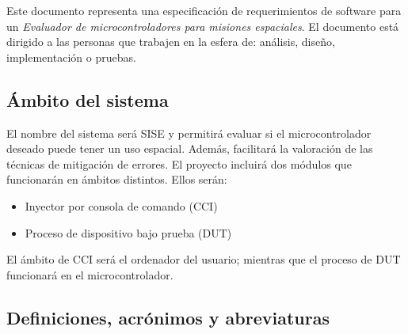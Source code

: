 \documentclass[
11pt, %
codirector, %
]{charter}
\begin{document}
Este documento representa una especificación de requerimientos de software para un \emph{Evaluador de microcontroladores para misiones espaciales}.
El documento está dirigido a las personas que trabajen en la esfera de: análisis, diseño, implementación o pruebas.

\subsection{Ámbito del sistema}
\label{sub:ambito}

El nombre del sistema será SISE y permitirá evaluar si el microcontrolador deseado puede tener un uso espacial.
Además, facilitará la valoración de las técnicas de mitigación de errores.
El proyecto incluirá dos módulos que funcionarán en ámbitos distintos.
Ellos serán:

\begin{itemize}
	\item Inyector por consola de comando (CCI)
	\item Proceso de dispositivo bajo prueba (DUT)
\end{itemize}

El ámbito de CCI será el ordenador del usuario; mientras que el proceso de DUT funcionará en el microcontrolador.

\subsection{Definiciones, acrónimos y abreviaturas}
\label{sub:definiciones}
\end{document}

